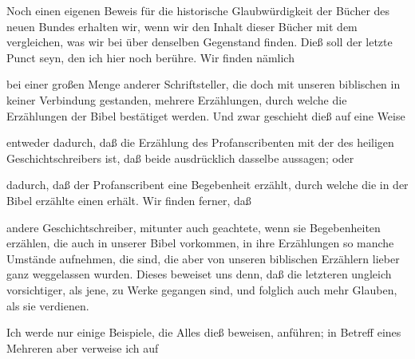 Noch einen eigenen Beweis für die historische Glaubwürdigkeit der Bücher des neuen Bundes erhalten wir, wenn wir den Inhalt dieser Bücher mit dem vergleichen, was wir bei  über denselben Gegenstand finden. Dieß soll der letzte Punct seyn, den ich hier noch berühre. Wir finden nämlich
\begin{aufzb}
\item bei einer großen Menge anderer Schriftsteller, die doch mit unseren biblischen in keiner Verbindung gestanden, mehrere Erzählungen, durch welche die Erzählungen der Bibel bestätiget werden. Und zwar geschieht dieß auf eine  Weise
\begin{aufzc}
\item entweder dadurch, daß die Erzählung des Profanscribenten mit der des heiligen Geschichtschreibers  ist, daß beide ausdrücklich dasselbe aussagen; oder~
\item dadurch, daß der Profanscribent eine Begebenheit erzählt, durch welche die in der Bibel erzählte einen  erhält. Wir finden ferner, daß
\end{aufzc}
\item andere Geschichtschreiber, mitunter auch geachtete, wenn sie Begebenheiten erzählen, die auch in unserer Bibel vorkommen, in ihre Erzählungen so manche Umstände aufnehmen, die  sind, die aber von unseren biblischen Erzählern lieber ganz weggelassen wurden. Dieses beweiset uns denn, daß die letzteren ungleich vorsichtiger, als jene, zu Werke gegangen sind, und folglich auch mehr Glauben, als sie verdienen.
\end{aufzb}
Ich werde nur einige Beispiele, die Alles dieß beweisen, anführen; in Betreff eines Mehreren aber verweise ich auf  

